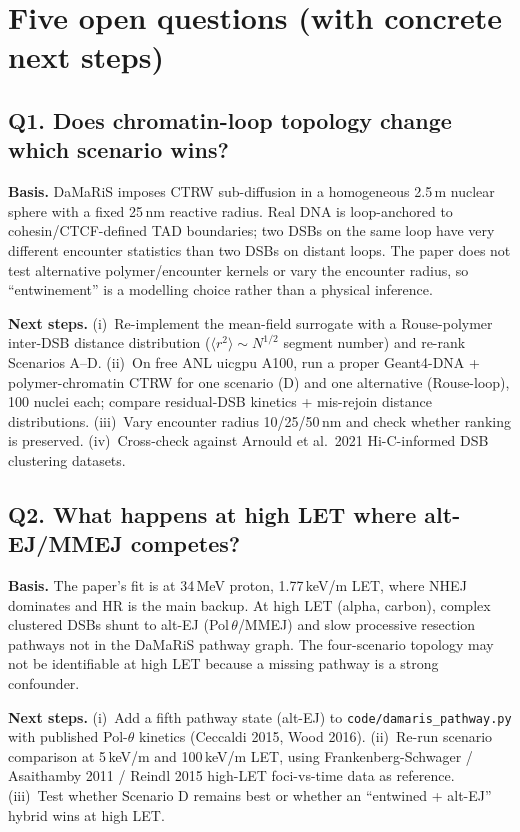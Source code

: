 \section{Five open questions (with concrete next steps)}
\label{sec:open-questions}

\subsection*{Q1. Does chromatin-loop topology change which scenario wins?}
\textbf{Basis.} DaMaRiS imposes CTRW sub-diffusion in a homogeneous
2.5\,\textmu m nuclear sphere with a fixed 25\,nm reactive radius.
Real DNA is loop-anchored to cohesin/CTCF-defined TAD boundaries;
two DSBs on the same loop have very different encounter statistics
than two DSBs on distant loops. The paper does not test alternative
polymer/encounter kernels or vary the encounter radius, so
``entwinement'' is a modelling choice rather than a physical
inference.

\textbf{Next steps.} (i)~Re-implement the mean-field surrogate with
a Rouse-polymer inter-DSB distance distribution
($\langle r^2\rangle \sim N^{1/2}$ segment number) and re-rank
Scenarios A--D. (ii)~On free ANL uicgpu A100, run a proper
Geant4-DNA + polymer-chromatin CTRW for one scenario (D) and one
alternative (Rouse-loop), 100 nuclei each; compare residual-DSB
kinetics + mis-rejoin distance distributions. (iii)~Vary encounter
radius 10/25/50\,nm and check whether ranking is preserved.
(iv)~Cross-check against Arnould et al.\ 2021 Hi-C-informed DSB
clustering datasets.

\subsection*{Q2. What happens at high LET where alt-EJ/MMEJ competes?}
\textbf{Basis.} The paper's fit is at 34\,MeV proton, 1.77\,keV/\textmu m
LET, where NHEJ dominates and HR is the main backup. At high LET
(alpha, carbon), complex clustered DSBs shunt to alt-EJ
(Pol\,$\theta$/MMEJ) and slow processive resection pathways not in
the DaMaRiS pathway graph. The four-scenario topology may not be
identifiable at high LET because a missing pathway is a strong
confounder.

\textbf{Next steps.} (i)~Add a fifth pathway state (alt-EJ) to
\texttt{code/damaris\_pathway.py} with published Pol-$\theta$
kinetics (Ceccaldi 2015, Wood 2016). (ii)~Re-run scenario
comparison at 5\,keV/\textmu m and 100\,keV/\textmu m LET, using
Frankenberg-Schwager / Asaithamby 2011 / Reindl 2015 high-LET
foci-vs-time data as reference. (iii)~Test whether Scenario D
remains best or whether an ``entwined + alt-EJ'' hybrid wins at
high LET.

